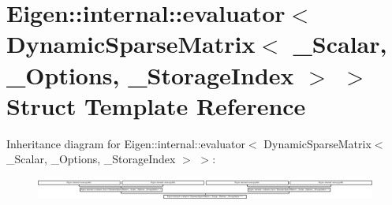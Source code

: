 \hypertarget{struct_eigen_1_1internal_1_1evaluator_3_01_dynamic_sparse_matrix_3_01___scalar_00_01___options_00_01___storage_index_01_4_01_4}{}\section{Eigen\+:\+:internal\+:\+:evaluator$<$ Dynamic\+Sparse\+Matrix$<$ \+\_\+\+Scalar, \+\_\+\+Options, \+\_\+\+Storage\+Index $>$ $>$ Struct Template Reference}
\label{struct_eigen_1_1internal_1_1evaluator_3_01_dynamic_sparse_matrix_3_01___scalar_00_01___options_00_01___storage_index_01_4_01_4}
Inheritance diagram for Eigen\+:\+:internal\+:\+:evaluator$<$ Dynamic\+Sparse\+Matrix$<$ \+\_\+\+Scalar, \+\_\+\+Options, \+\_\+\+Storage\+Index $>$ $>$\+:\begin{figure}[H]
\begin{center}
\leavevmode
\includegraphics[height=0.752688cm]{struct_eigen_1_1internal_1_1evaluator_3_01_dynamic_sparse_matrix_3_01___scalar_00_01___options_00_01___storage_index_01_4_01_4}
\end{center}
\end{figure}
